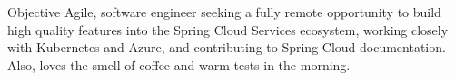 \begin{section}{Objective}
  Agile, software engineer seeking a fully remote opportunity to build high quality features into the Spring Cloud Services ecosystem, working closely with Kubernetes and Azure, and contributing to Spring Cloud documentation. Also, loves the smell of coffee and warm tests in the morning.
\end{section}
